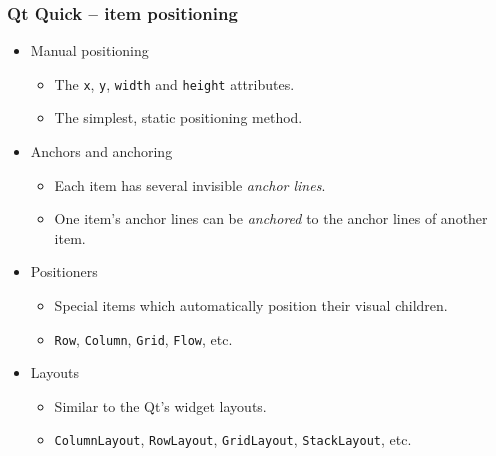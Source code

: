 \begin{frame}
  \frametitle{Qt Quick -- item positioning}
  \begin{itemize}
    \item Manual positioning
    \begin{itemize}
      \item The \texttt{x}, \texttt{y}, \texttt{width} and \texttt{height}
        attributes.
      \item The simplest, static positioning method.
    \end{itemize}
    \item Anchors and anchoring
    \begin{itemize}
      \item Each item has several invisible {\em anchor lines}.
      \item One item's anchor lines can be {\em anchored} to the anchor lines
        of another item.
    \end{itemize}
    \item Positioners
    \begin{itemize}
      \item Special items which automatically position their visual children.
      \item \texttt{Row}, \texttt{Column}, \texttt{Grid}, \texttt{Flow}, etc.
    \end{itemize}
    \item Layouts
    \begin{itemize}
      \item Similar to the Qt's widget layouts.
      \item \texttt{ColumnLayout}, \texttt{RowLayout}, \texttt{GridLayout},
        \texttt{StackLayout}, etc.
    \end{itemize}
  \end{itemize}
\end{frame}

